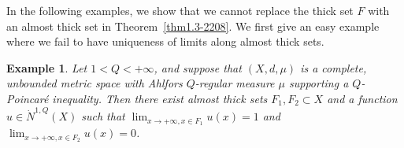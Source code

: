 \documentclass[10pt]{amsart}
\newtheorem{example}[theorem]{Example}
\numberwithin{equation}{section}
\begin{document}
%

In the following examples, we show that we cannot replace the thick set $F$ with an almost thick set in Theorem~\ref{thm1.3-2208}.  We first give an easy example where we fail to have uniqueness of limits along almost thick sets.

\begin{example}\label{ex:EasyAlmostThick}
Let $1<Q<+\infty$, and suppose that $(X,d,\mu)$ is a complete, unbounded metric space with Ahlfors $Q$-regular measure $\mu$ supporting a $Q$-Poincar\'e inequality.  Then there exist almost thick sets $F_1,F_2\subset X$ and a function $u\in\dot N^{1,Q}(X)$ such that $\lim_{x\to+\infty,x\in F_1}u(x)=1$ and $\lim_{x\to+\infty,x\in F_2}u(x)=0$.
\end{example}
\end{document}
